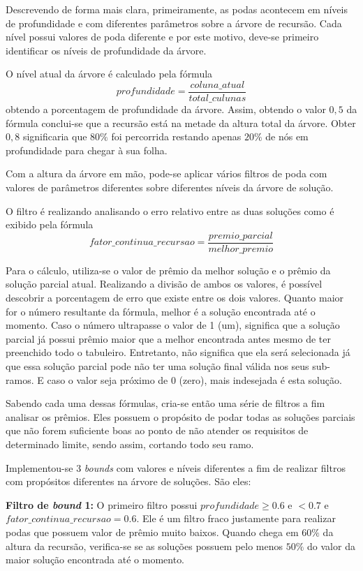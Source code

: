\documentclass[12pt]{article}
\begin{document}
			Descrevendo de forma mais clara, primeiramente, as podas acontecem em níveis de profundidade e com diferentes parâmetros sobre a árvore de recursão. Cada nível possui valores de poda diferente e por este motivo, deve-se primeiro identificar os níveis de profundidade da árvore.

			O nível atual da árvore é calculado pela fórmula $$ profundidade = \dfrac{coluna\_atual}{total\_culunas} $$ obtendo a porcentagem de profundidade da árvore.
			Assim, obtendo o valor $ 0,5 $ da fórmula conclui-se que a recursão está na metade da altura total da árvore. Obter $ 0,8 $ significaria que $ 80\% $ foi percorrida restando apenas $ 20\% $ de nós em profundidade para chegar à sua folha.

			Com a altura da árvore em mão, pode-se aplicar vários filtros de poda com valores de parâmetros diferentes sobre diferentes níveis da árvore de solução.


			O filtro é realizando analisando o erro relativo entre as duas soluções como é exibido pela fórmula $$ fator\_continua\_recursao = \dfrac{premio\_parcial}{melhor\_premio} $$

			Para o cálculo, utiliza-se o valor de prêmio da melhor solução e o prêmio da solução parcial atual. Realizando a divisão de ambos os valores, é possível descobrir a porcentagem de erro que existe entre os dois valores. Quanto maior for o número resultante da fórmula, melhor é a solução encontrada até o momento. Caso o número ultrapasse o valor de 1 (um), significa que a solução parcial já possui prêmio maior que a melhor encontrada antes mesmo de ter preenchido todo o tabuleiro. Entretanto, não significa que ela será selecionada já que essa solução parcial pode não ter uma solução final válida nos seus sub-ramos. E caso o valor seja próximo de $ 0 $ (zero), mais indesejada é esta solução.


			Sabendo cada uma dessas fórmulas, cria-se então uma série de filtros a fim analisar os prêmios. Eles possuem o propósito de podar todas as soluções parciais que não forem suficiente boas ao ponto de não atender os requisitos de determinado limite, sendo assim, cortando todo seu ramo.


			Implementou-se 3 \textit{bounds} com valores e níveis diferentes a fim de realizar filtros com propósitos diferentes na árvore de soluções. São eles:

			\textbf{Filtro de \textit{bound} 1:} O primeiro filtro possui $ profundidade \ge 0.6 $ e $ < 0.7 $ e $ fator\_continua\_recursao = 0.6$. Ele é um filtro fraco justamente para realizar podas que possuem valor de prêmio muito baixos. Quando chega em $ 60\% $ da altura da recursão, verifica-se se as soluções possuem pelo menos $ 50\% $ do valor da maior solução encontrada até o momento.
\end{document}
